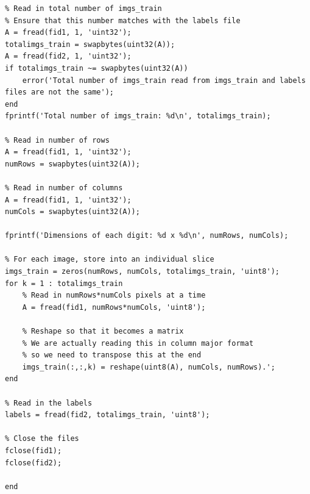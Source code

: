 \documentclass{article}
\begin{document}
\begin{appendices}
\begin{verbatim}
% Read in total number of imgs_train
% Ensure that this number matches with the labels file
A = fread(fid1, 1, 'uint32');
totalimgs_train = swapbytes(uint32(A));
A = fread(fid2, 1, 'uint32');
if totalimgs_train ~= swapbytes(uint32(A))
    error('Total number of imgs_train read from imgs_train and labels files are not the same');
end
fprintf('Total number of imgs_train: %d\n', totalimgs_train);

% Read in number of rows
A = fread(fid1, 1, 'uint32');
numRows = swapbytes(uint32(A));

% Read in number of columns
A = fread(fid1, 1, 'uint32');
numCols = swapbytes(uint32(A));

fprintf('Dimensions of each digit: %d x %d\n', numRows, numCols);

% For each image, store into an individual slice
imgs_train = zeros(numRows, numCols, totalimgs_train, 'uint8');
for k = 1 : totalimgs_train
    % Read in numRows*numCols pixels at a time
    A = fread(fid1, numRows*numCols, 'uint8');

    % Reshape so that it becomes a matrix
    % We are actually reading this in column major format
    % so we need to transpose this at the end
    imgs_train(:,:,k) = reshape(uint8(A), numCols, numRows).';
end

% Read in the labels
labels = fread(fid2, totalimgs_train, 'uint8');

% Close the files
fclose(fid1);
fclose(fid2);

end

\end{verbatim}


\end{appendices}
\end{document}
